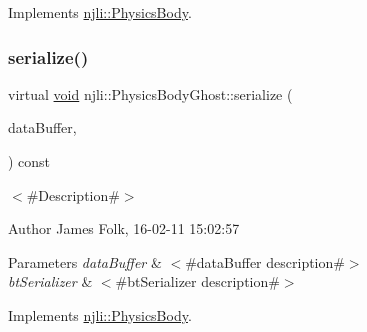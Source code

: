 Implements \mbox{\hyperlink{classnjli_1_1_physics_body_a832ed4f79a2b52b334d63d094364f86a}{njli\+::\+Physics\+Body}}.

\mbox{\label{classnjli_1_1_physics_body_ghost_ad3f75b8cbff7431afbb14569bda203c4}} 
\subsubsection{\texorpdfstring{serialize()}{serialize()}}
{\footnotesize\ttfamily virtual \mbox{\hyperlink{_thread_8h_af1e856da2e658414cb2456cb6f7ebc66}{void}} njli\+::\+Physics\+Body\+Ghost\+::serialize (\begin{DoxyParamCaption}\item[{\mbox{\hyperlink{_thread_8h_af1e856da2e658414cb2456cb6f7ebc66}{void}} $\ast$}]{data\+Buffer,  }\item[{bt\+Serializer $\ast$}]{ }\end{DoxyParamCaption}) const\hspace{0.3cm}{\ttfamily [virtual]}}



$<$\#\+Description\#$>$ 

\begin{DoxyAuthor}{Author}
James Folk, 16-\/02-\/11 15\+:02\+:57
\end{DoxyAuthor}

\begin{DoxyParams}{Parameters}
{\em data\+Buffer} & $<$\#data\+Buffer description\#$>$ \\
\hline
{\em bt\+Serializer} & $<$\#bt\+Serializer description\#$>$ \\
\hline
\end{DoxyParams}


Implements \mbox{\hyperlink{classnjli_1_1_physics_body_a3c40378e7f3033557ec6adf9428b6a9d}{njli\+::\+Physics\+Body}}.

\mbox{\label{classnjli_1_1_physics_body_ghost_a87c4ba0c2317a6e6e40231f58a1c9ed5}} 
